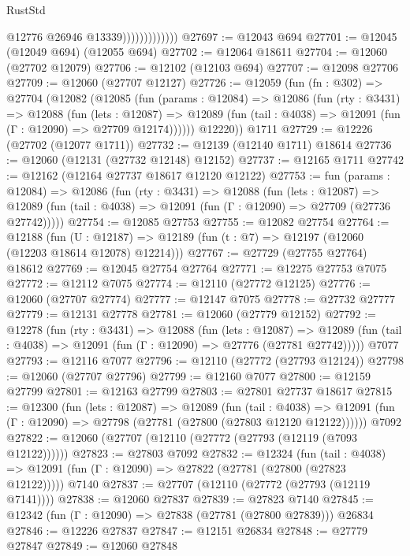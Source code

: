 \begin{lexlean}{RustStd}
\begin{coremodule}
                              @12776
                              @26946
                              @13339)))))))))))))
@27697 := @12043 @694
@27701 := @12045 (@12049 @694) (@12055 @694)
@27702 := @12064 @18611
@27704 := @12060 (@27702 @12079)
@27706 := @12102 (@12103 @694)
@27707 := @12098 @27706
@27709 := @12060 (@27707 @12127)
@27726 := @12059
    (fun (fn : @302) =>
    @27704
      (@12082
        (@12085
          (fun (params : @12084) =>
          @12086
            (fun (rty : @3431) =>
            @12088
              (fun (lets : @12087) =>
              @12089 (fun (tail : @4038) => @12091 (fun (Γ : @12090) => @27709 @12174))))))
        @12220))
    @1711
@27729 := @12226 (@27702 (@12077 @1711))
@27732 := @12139 (@12140 @1711) @18614
@27736 := @12060 (@12131 (@27732 @12148) @12152)
@27737 := @12165 @1711
@27742 := @12162 (@12164 @27737 @18617 @12120 @12122)
@27753 := fun (params : @12084) =>
  @12086
    (fun (rty : @3431) =>
    @12088
      (fun (lets : @12087) =>
      @12089 (fun (tail : @4038) => @12091 (fun (Γ : @12090) => @27709 (@27736 @27742)))))
@27754 := @12085 @27753
@27755 := @12082 @27754
@27764 := @12188
    (fun (U : @12187) => @12189 (fun (t : @7) => @12197 (@12060 (@12203 @18614 @12078) @12214)))
@27767 := @27729 (@27755 @27764) @18612
@27769 := @12045 @27754 @27764
@27771 := @12275 @27753 @7075
@27772 := @12112 @7075
@27774 := @12110 (@27772 @12125)
@27776 := @12060 (@27707 @27774)
@27777 := @12147 @7075
@27778 := @27732 @27777
@27779 := @12131 @27778
@27781 := @12060 (@27779 @12152)
@27792 := @12278
    (fun (rty : @3431) =>
    @12088
      (fun (lets : @12087) =>
      @12089 (fun (tail : @4038) => @12091 (fun (Γ : @12090) => @27776 (@27781 @27742)))))
    @7077
@27793 := @12116 @7077
@27796 := @12110 (@27772 (@27793 @12124))
@27798 := @12060 (@27707 @27796)
@27799 := @12160 @7077
@27800 := @12159 @27799
@27801 := @12163 @27799
@27803 := @27801 @27737 @18617
@27815 := @12300
    (fun (lets : @12087) =>
    @12089
      (fun (tail : @4038) =>
      @12091 (fun (Γ : @12090) => @27798 (@27781 (@27800 (@27803 @12120 @12122))))))
    @7092
@27822 := @12060 (@27707 (@12110 (@27772 (@27793 (@12119 (@7093 @12122))))))
@27823 := @27803 @7092
@27832 := @12324
    (fun (tail : @4038) => @12091 (fun (Γ : @12090) => @27822 (@27781 (@27800 (@27823 @12122)))))
    @7140
@27837 := @27707 (@12110 (@27772 (@27793 (@12119 @7141))))
@27838 := @12060 @27837
@27839 := @27823 @7140
@27845 := @12342 (fun (Γ : @12090) => @27838 (@27781 (@27800 @27839))) @26834
@27846 := @12226 @27837
@27847 := @12151 @26834
@27848 := @27779 @27847
@27849 := @12060 @27848

\end{coremodule}
\end{lexlean}

